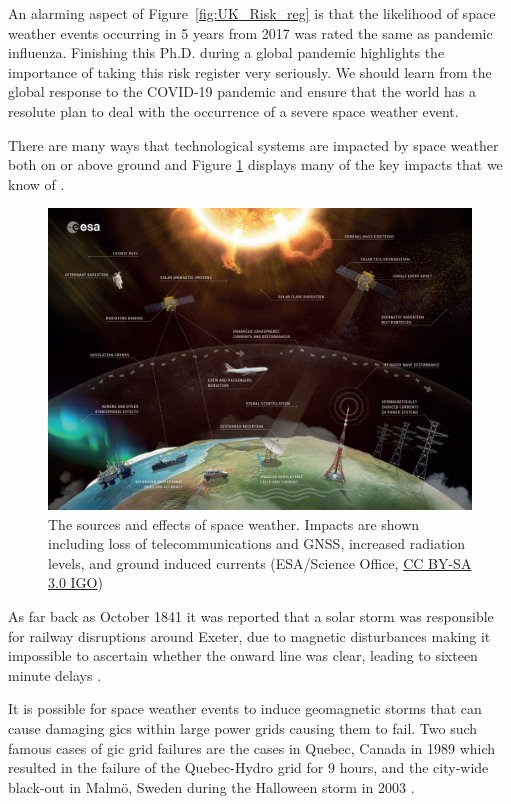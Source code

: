 An alarming aspect of Figure~\ref{fig:UK_Risk_reg} is that the likelihood of space weather events occurring in 5 years from 2017 was rated the same as pandemic influenza. Finishing this Ph.D. during a global pandemic highlights the importance of taking this risk register very seriously. We should learn from the global response to the COVID-19 pandemic and ensure that the world has a resolute plan to deal with the occurrence of a severe space weather event.

There are many ways that technological systems are impacted by space weather both on or above ground and Figure \ref{fig:space_weather_impacts} displays many of the key impacts that we know of \citep{beggan_ground_2018}. 


\begin{figure}[ht!]
	\centering
	\includegraphics[width=\columnwidth]{Space_weather_effects_rescaled.jpg}
	\caption{The sources and effects of space weather. Impacts are shown including loss of telecommunications and GNSS, increased radiation levels, and ground induced currents (ESA/Science Office, \href{http://www.esa.int/spaceinimages/ESA_Multimedia/Copyright_Notice_Images}{CC BY-SA 3.0 IGO})}
	\label{fig:space_weather_impacts}
\end{figure}

As far back as October 1841 it was reported that a solar storm was responsible for railway disruptions around Exeter, due to magnetic disturbances making it impossible to ascertain whether the onward line was clear, leading to sixteen minute delays \citep{nature_observations_1871}. 

It is possible for space weather events to induce geomagnetic storms that can cause damaging \glspl{gic} within large power grids causing them to fail. Two such famous cases of \gls{gic} grid failures are the cases in Quebec, Canada in 1989 which resulted in the failure of the Quebec-Hydro grid for 9 hours, and the city-wide black-out in Malm{\"o}, Sweden during the Halloween storm in 2003 \citep{viljanen_european_2011, beggan_ground_2018}.

